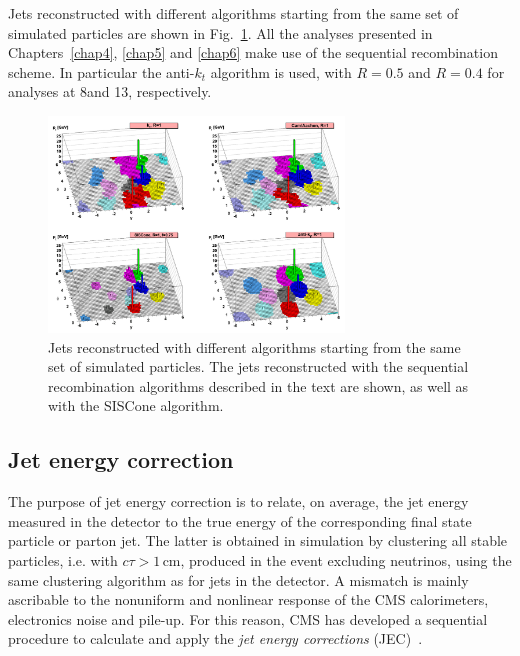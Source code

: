Jets reconstructed with different algorithms starting from the same set of simulated particles are shown in Fig.~\ref{fig:jets}. All the analyses presented in Chapters~\ref{chap4}, \ref{chap5} and \ref{chap6} make use of the sequential recombination scheme. In particular the anti-$k_t$ algorithm is used, with $R=0.5$ and $R=0.4$ for analyses at 8\TeV and 13\TeV, respectively.

\begin{figure}[htb]
\centering
\includegraphics[width=0.7\textwidth]{images/jets.png}
\caption{Jets reconstructed with different algorithms starting from the same set of simulated particles. The jets reconstructed with the sequential recombination algorithms described in the text are shown, as well as with the SISCone algorithm.}\label{fig:jets}
\end{figure}

\subsection{Jet energy correction}\label{sec:jec}

The purpose of jet energy correction is to relate, on average, the jet energy measured in the detector to the true energy of the corresponding final state particle or parton jet. The latter is obtained in simulation by clustering all stable particles, i.e. with $c\tau > 1$\,cm, produced in the event excluding neutrinos, using the same clustering algorithm as for jets in the detector. A mismatch is mainly ascribable to the nonuniform and nonlinear response of the CMS calorimeters, electronics noise and pile-up. For this reason, CMS has developed a sequential procedure to calculate and apply the \emph{jet energy corrections} (JEC)~\cite{Chatrchyan:2011ds}.

